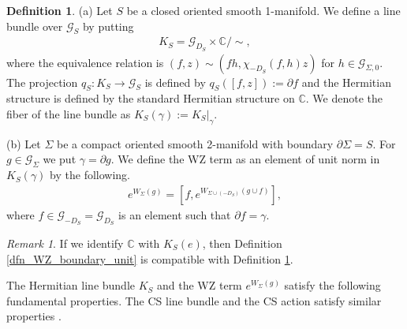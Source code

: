 \documentclass[a4paper,a4paper]{article}
\theoremstyle{definition}
\newtheorem{dfn}[thm]{Definition}
\theoremstyle{remark}
\newtheorem*{rem}{Remark}
\newcommand{\C}{\mathbb{C}}
\newcommand{\G}{\mathcal{G}}
\begin{document}
\begin{dfn} \label{dfn_WZ_boundary}
(a) Let $S$ be a closed oriented smooth 1-manifold. We define a line bundle over $\G_S$ by putting
\begin{eqnarray}
K_S = \G_{D_S} \times \C / \sim ,
\end{eqnarray}
where the equivalence relation is $(f, z) \sim (fh, \chi_{-D_S}(f,h) z)$ for $h \in \G_{\Sigma,0}$. The projection $q_S : K_S \to \G_S$ is defined by $q_S([f, z]) := \partial f$ and the Hermitian structure is defined by the standard Hermitian structure on $\C$. We denote the fiber of the line bundle as $K_S(\gamma) := K_S|_\gamma$.

(b) Let $\Sigma$ be a compact oriented smooth 2-manifold with boundary $\partial \Sigma = S$. For $g \in \G_\Sigma$ we put $\gamma = \partial g$. We define the WZ term as an element of unit norm in $K_S(\gamma)$ by the following.
\begin{eqnarray}
e^{ W_\Sigma(g) } = [ f, e^{ W_{\Sigma \cup (-D_S)}(g \cup f) } ],
\end{eqnarray}
where $f \in \G_{-D_S} = \G_{D_S}$ is an element such that $\partial f = \gamma$.
\end{dfn}

\begin{rem}
If we identify $\C$ with $K_S(e)$, then Definition \ref{dfn_WZ_boundary_unit} is compatible with Definition \ref{dfn_WZ_boundary}.
\end{rem}

The Hermitian line bundle $K_S$ and the WZ term $e^{ W_\Sigma(g) }$ satisfy the following fundamental properties. The CS line bundle and the CS action satisfy similar properties \cite{F1}.
\end{document}
